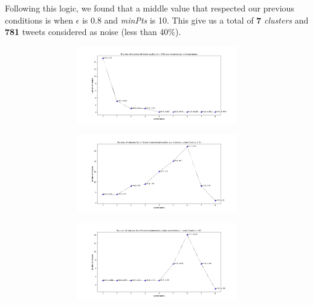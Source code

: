 \documentclass{article}
\begin{document}
Following this logic, we found that a middle value that respected our previous conditions is when $\epsilon$ is 0.8 and \textit{minPts} is 10. This give us a total of \textbf{7} \textit{clusters} and \textbf{781} tweets considered as noise (less than 40\%).

\begin{figure}[H]
    \centering 
    \begin{subfigure}{1\textwidth}  
        \begin{subfigure}{.5\textwidth}
            \centering   
            \includegraphics[width=1\linewidth]{./img/e0-5n.png}
            \caption{ }
        \end{subfigure}
        \begin{subfigure}{.5\textwidth}  
            \centering 
            \includegraphics[width=1\linewidth]{./img/en5.png}
            \caption{}
        \end{subfigure}
        \begin{subfigure}{.5\textwidth} 
            \centering  
            \includegraphics[width=1\linewidth]{./img/en10.png}

\end{subfigure}
\end{subfigure}
\end{figure}
\end{document}
